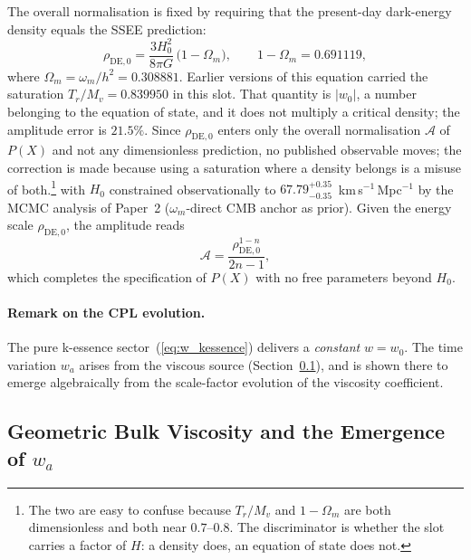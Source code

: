 The overall normalisation is fixed by requiring that the present-day
dark-energy density equals the SSEE prediction:
%
\begin{equation}
  \rho_{\mathrm{DE},0}
    = \frac{3H_{0}^{2}}{8\pi G}\,\bigl(1-\Omega_m\bigr),
  \qquad 1-\Omega_m = 0.691119,
  \label{eq:rho_de0}
\end{equation}
%
where $\Omega_m = \omega_m/h^2 = 0.308881$.  Earlier versions of this
equation carried the saturation $T_{r}/M_{v} = 0.839950$ in this slot.  That
quantity is $|w_0|$, a number belonging to the equation of state, and it does
not multiply a critical density; the amplitude error is $21.5\%$.  Since
$\rho_{\mathrm{DE},0}$ enters only the overall normalisation
$\mathcal{A}$ of $P(X)$ and not any dimensionless prediction, no published
observable moves; the correction is made because using a saturation where a
density belongs is a misuse of both.\footnote{The two are easy to confuse
because $T_r/M_v$ and $1-\Omega_m$ are both dimensionless and both near
$0.7$--$0.8$.  The discriminator is whether the slot carries a factor of
$H$: a density does, an equation of state does not.}
%
with $H_{0}$ constrained observationally to
$67.79^{+0.35}_{-0.35}$~km\,s$^{-1}$\,Mpc$^{-1}$ by the MCMC analysis of
Paper~2 ($\omega_m$-direct CMB anchor as prior).  Given the energy scale $\rho_{\mathrm{DE},0}$, the amplitude reads
%
\begin{equation}
  \mathcal{A}
    = \frac{\rho_{\mathrm{DE},0}^{1-n}}{2n-1},
  \label{eq:amplitude}
\end{equation}
%
which completes the specification of $P(X)$ with no free parameters beyond $H_{0}$.

\paragraph{Remark on the CPL evolution.}
The pure k-essence sector~(\ref{eq:w_kessence}) delivers a \emph{constant}
$w = w_{0}$.  The time variation $w_{a}$ arises from the viscous source
(Section~\ref{sec:eft:viscosity}), and is shown there to emerge algebraically
from the scale-factor evolution of the viscosity coefficient.

\subsection{Geometric Bulk Viscosity and the Emergence of \texorpdfstring{$w_a$}{wa}}
\label{sec:eft:viscosity}

